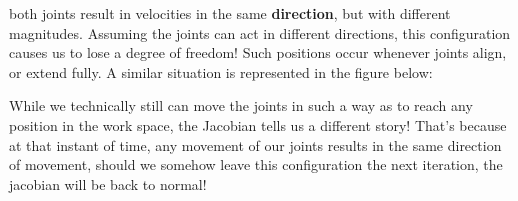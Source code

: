 \documentclass{article}
\begin{document}
{    both joints result in velocities in the same \textbf{direction}, but with different magnitudes. 
    Assuming the joints can act in different directions, this configuration causes us to lose a degree of freedom!
    Such positions occur whenever joints align, or extend fully. A similar situation is represented in the figure below:

    \begin{center}
    \end{center}

    While we technically still can move the joints in such a way as to reach any position in the work space, 
    the Jacobian tells us a different story! That's because at that instant of time, any movement of our joints
    results in the same direction of movement, should we somehow leave this configuration the next iteration, the jacobian will be back to normal!

}
\end{document}

